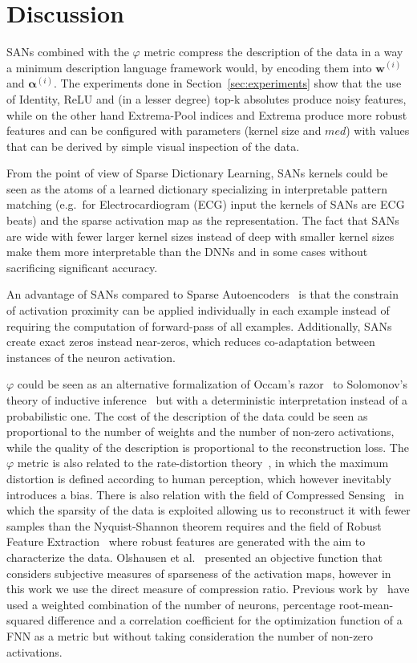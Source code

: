 \documentclass[journal]{IEEEtran}
\begin{document}
\section{Discussion}\label{sec:discussion}
SANs combined with the $\varphi$ metric compress the description of the data in a way a minimum description language framework would, by encoding them into $\bm{w}^{(i)}$ and $\bm{\alpha}^{(i)}$.
The experiments done in Section~\ref{sec:experiments} show that the use of Identity, ReLU and (in a lesser degree) top-k absolutes produce noisy features, while on the other hand Extrema-Pool indices and Extrema produce more robust features and can be configured with parameters (kernel size and $med$) with values that can be derived by simple visual inspection of the data.

From the point of view of Sparse Dictionary Learning, SANs kernels could be seen as the atoms of a learned dictionary specializing in interpretable pattern matching (e.g.\ for Electrocardiogram (ECG) input the kernels of SANs are ECG beats) and the sparse activation map as the representation.
The fact that SANs are wide with fewer larger kernel sizes instead of deep with smaller kernel sizes make them more interpretable than the DNNs and in some cases without sacrificing significant accuracy.

An advantage of SANs compared to Sparse Autoencoders~\cite{ng2011sparse} is that the constrain of activation proximity can be applied individually in each example instead of requiring the computation of forward-pass of all examples.
Additionally, SANs create exact zeros instead near-zeros, which reduces co-adaptation between instances of the neuron activation.

$\varphi$ could be seen as an alternative formalization of Occam's razor~\cite{soklakov2002occam} to Solomonov's theory of inductive inference~\cite{solomonoff1964formal} but with a deterministic interpretation instead of a probabilistic one.
The cost of the description of the data could be seen as proportional to the number of weights and the number of non-zero activations, while the quality of the description is proportional to the reconstruction loss.
The $\varphi$ metric is also related to the rate-distortion theory~\cite{burger1971rate}, in which the maximum distortion is defined according to human perception, which however inevitably introduces a bias.
There is also relation with the field of Compressed Sensing~\cite{donoho2006compressed} in which the sparsity of the data is exploited allowing us to reconstruct it with fewer samples than the Nyquist-Shannon theorem requires and the field of Robust Feature Extraction~\cite{kim2013deep} where robust features are generated with the aim to characterize the data.
Olshausen et al.~\cite{olshausen1996emergence} presented an objective function that considers subjective measures of sparseness of the activation maps, however in this work we use the direct measure of compression ratio.
Previous work by~\cite{zhang2017ecg} have used a weighted combination of the number of neurons, percentage root-mean-squared difference and a correlation coefficient for the optimization function of a FNN as a metric but without taking consideration the number of non-zero activations.
\end{document}
